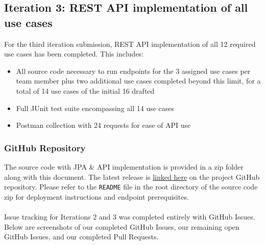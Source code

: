 \subsection{Iteration 3: REST API implementation of all use cases}
For the third iteration submission, REST API implementation of all 12 required use cases has been completed. This includes:
\begin{itemize}
    \item All source code necessary to run endpoints for the 3 assigned use cases per team member plus two additional use cases completed beyond this limit, for a total of 14 use cases of the initial 16 drafted
    \item Full JUnit test suite encompassing all 14 use cases
    \item Postman collection with 24 requests for ease of API use
\end{itemize}

\subsubsection{GitHub Repository}

The source code with JPA \& API implementation is provided in a zip folder along with this document. The latest release is \href{https://github.com/tkm3d1a/cs5324_s24_class_project/releases/tag/0.1}{linked here} on the project GitHub repository. Please refer to the \texttt{README} file in the root directory of the source code zip for deployment instructions and endpoint prerequisites. \\
\\
Issue tracking for Iterations 2 and 3 was completed entirely with GitHub Issues. Below are screenshots of our completed GitHub Issues, our remaining open GitHub Issues, and our completed Pull Requests.

